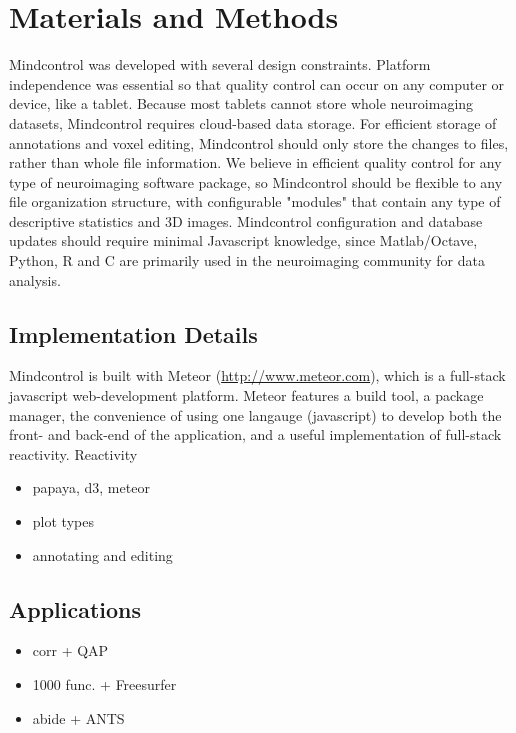 \section{Materials and Methods}

Mindcontrol was developed with several design constraints. Platform independence was essential so that quality control can occur on any computer or device, like a tablet. Because most tablets cannot store whole neuroimaging datasets, Mindcontrol requires cloud-based data storage. For efficient storage of annotations and voxel editing, Mindcontrol should only store the changes to files, rather than whole file information. We believe in efficient quality control for any type of neuroimaging software package, so Mindcontrol should be flexible to any file organization structure, with configurable "modules" that contain any type of descriptive statistics and 3D images. Mindcontrol configuration and database updates should require minimal Javascript knowledge, since Matlab/Octave, Python, R and C are primarily used in the neuroimaging community for data analysis.  


\subsection{Implementation Details}

Mindcontrol is built with Meteor (\href{http://www.meteor.com}{http://www.meteor.com}), which is a full-stack javascript web-development platform. Meteor features a build tool, a package manager, the convenience of using one langauge (javascript) to develop both the front- and back-end of the application, and a useful implementation of full-stack reactivity. Reactivity 

\begin{itemize}
\item papaya, d3, meteor
\item plot types
\item annotating and editing
\end{itemize}

\subsection{Applications}

\begin{itemize}
\item corr + QAP
\item 1000 func. + Freesurfer
\item abide + ANTS
\end{itemize}

